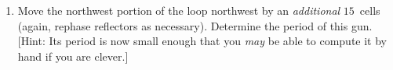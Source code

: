 \begin{multicols}{2}
\begin{problemstar}
\begin{enumerate}[label=\bf\color{ocre}(\alph*)]
			\item {} Move the northwest portion of the loop northwest by an \emph{additional} $15$~cells (again, rephase reflectors as necessary). Determine the period of this gun. [Hint: Its period is now small enough that you \emph{may} be able to compute it by hand if you are clever.]
		\end{enumerate}
	\end{problemstar}
	
	
	
	
	
	
\end{multicols}
\normalsize\vspace*{0.01cm}
